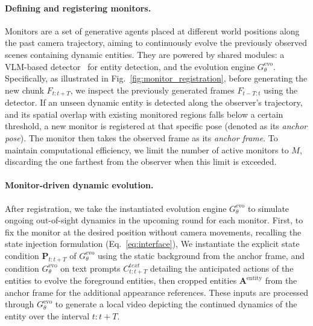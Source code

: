 \vspace{-2mm}
\paragraph{Defining and registering monitors.} Monitors are a set of generative agents placed at different world positions along the past camera trajectory, aiming to continuously evolve the previously observed scenes containing dynamic entities. They are powered by shared modules: a VLM-based detector~\cite{qwen3vl, sam3} for entity detection, and the evolution engine $G_{\theta}^\text{evo}$.
Specifically, as illustrated in Fig.~\ref{fig:monitor_registration}, before generating the new chunk $F_{t:t+T}$, we inspect the previously generated frames $F_{t-T:t}$ using the detector. If an unseen dynamic entity is detected along the observer's trajectory, and its spatial overlap with existing monitored regions falls below a certain threshold, a new monitor is registered at that specific pose (denoted as its \textit{anchor pose}). The monitor then takes the observed frame as its \textit{anchor frame}. To maintain computational efficiency, we limit the number of active monitors to $M$, discarding the one farthest from the observer when this limit is exceeded.

\vspace{-2mm}
\paragraph{Monitor-driven dynamic evolution.} After registration, we take the instantiated evolution engine $G_{\theta}^\text{evo}$ to simulate ongoing out-of-sight dynamics in the upcoming round for each monitor. First, to fix the monitor at the desired position without camera movements, recalling the state injection formulation (Eq.~\ref{eq:interface}), 
We instantiate the explicit state condition $\mathbf{P}_{t:t+T}$ of $G_{\theta}^{\text{evo}}$ using the static background from the anchor frame, and condition $G_{\theta}^\text{evo}$ on text prompts $C_{t:t+T}^{text}$ detailing the anticipated actions of the entities to evolve the foreground entities, then cropped entities $\mathbf{A}^{\text{entity}}$ from the anchor frame for the additional appearance references. These inputs are processed through $G_{\theta}^{\text{evo}}$ to generate a local video depicting the continued dynamics of the entity over the interval $t:t+T$.

